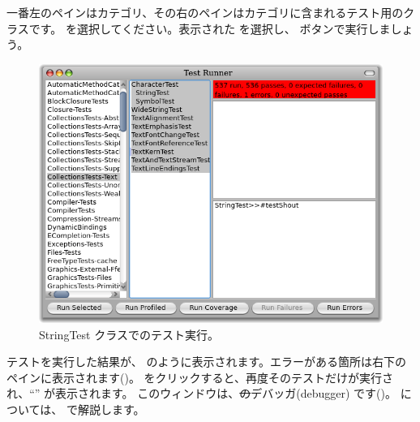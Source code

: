 \documentclass[a4paper,10pt,twoside]{book}
\begin{document}
{{{%

一番左のペインはカテゴリ、その右のペインはカテゴリに含まれるテスト用のクラスです。
を選択してください。表示された  を選択し、 ボタンで実行しましょう。

\begin{figure}[hbt]
\centerline {\includegraphics[width=\textwidth]{testRunnerOnStringTest}}
\caption{StringTest クラスでのテスト実行。
}
\end{figure}

テストを実行した結果が、 のように表示されます。エラーがある箇所は右下のペインに表示されます()。
 をクリックすると、再度そのテストだけが実行され、``'' が表示されます。
このウィンドウは、\st のデバッガ(debugger) です()。
 については、 で解説します。

}}}
\end{document}
